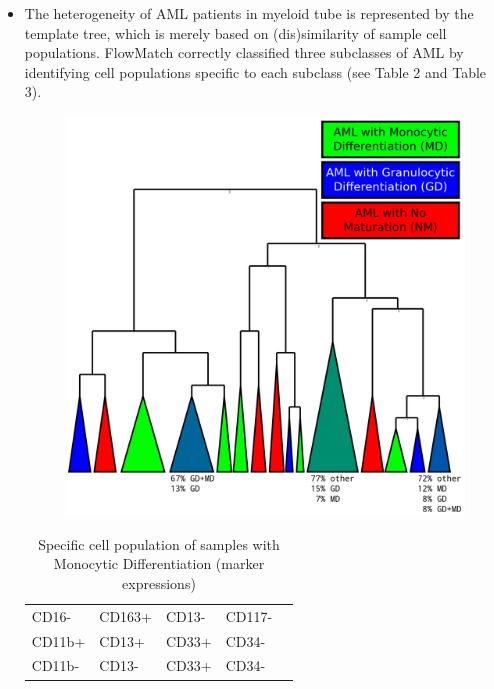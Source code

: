 \documentclass[landscape]{sciposter}
\begin{document}
\begin{multicols}{5}
\begin{itemize}
\item The heterogeneity of AML patients in myeloid tube is represented by the template tree,
which is merely based on (dis)similarity of sample cell populations.
FlowMatch correctly classified three subclasses of AML by identifying cell populations specific to each subclass (see Table 2 and Table 3).

\begin{figure} [h]
\centering
\includegraphics[width=\textwidth]{images/tree-summary.png}
\end{figure}

\begin{table}[htb]
\centering
\caption {Specific cell population of samples with Monocytic Differentiation (marker expressions)}
\resizebox{0.5\textwidth}{!} {
\begin{tabular} {l l l l l}
CD16-	&CD163+	&CD13-	&CD117-\\
CD11b+	&CD13+	&CD33+	&CD34-\\
CD11b-	&CD13-	&CD33+	&CD34-\\
\end{tabular}}
\end{table}


\end{itemize}
\end{multicols}
\end{document}
